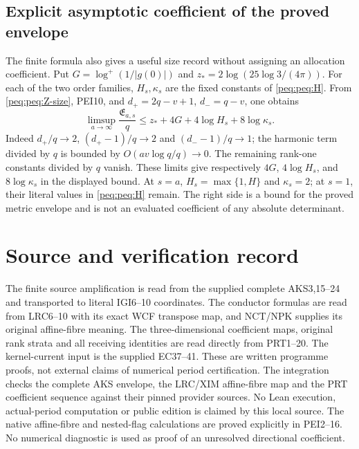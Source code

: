 \subsection{Explicit asymptotic coefficient of the proved envelope}

The finite formula also gives a useful size record without assigning
an allocation coefficient. Put
$G=\log^+(1/|g(0)|)$ and
$z_* =2\log(25\log3/(4\pi))$.
For each of the two order families, $H_s,\kappa_s$ are the fixed
constants of \eqref{peq:peq:H}. From \eqref{peq:peq:Z-size},
PEI10, and $d_+=2q-v+1$, $d_-=q-v$, one obtains
\[
 \limsup_{a\to\infty}\frac{\mathfrak E_{a,s}}q
 \le z_*+4G+4\log H_s+8\log\kappa_s.                            \tag{PEI17}
\]
Indeed $d_+/q\to2$, $(d_+-1)/q\to2$ and
$(d_--1)/q\to1$; the harmonic term divided by $q$ is bounded
by $O(av\log q/q)\to0$. The remaining rank-one constants divided
by $q$ vanish. These limits give respectively $4G$,
$4\log H_s$, and $8\log\kappa_s$ in the displayed bound.
At $s=a$, $H_s=\max\{1,H\}$ and $\kappa_s=2$;
at $s=1$, their literal values in \eqref{peq:peq:H} remain.
The right side is a bound for the proved metric envelope and is
not an evaluated coefficient of any absolute determinant.


\section*{Source and verification record}
The finite source amplification is read from the supplied complete AKS3,15--24 and transported to literal IGI6--10 coordinates. The conductor formulas are read from LRC6--10 with its exact WCF transpose map, and NCT/NPK supplies its original affine-fibre meaning. The three-dimensional coefficient maps, original rank strata and all receiving identities are read directly from PRT1--20. The kernel-current input is the supplied EC37--41. These are written programme proofs, not external claims of numerical period certification. The integration checks the complete AKS envelope, the LRC/XIM affine-fibre map and the PRT coefficient sequence against their pinned provider sources. No Lean execution, actual-period computation or public edition is claimed by this local source. The native affine-fibre and nested-flag calculations are proved explicitly in PEI2--16. No numerical diagnostic is used as proof of an unresolved directional coefficient.



\endgroup

